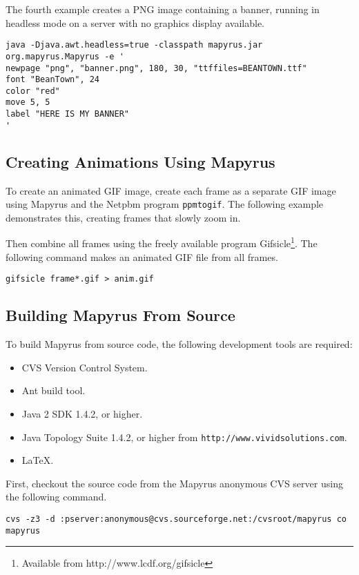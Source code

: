 The fourth example creates a PNG image containing a banner,
running in headless mode on a server with no graphics display available.

\begin{verbatim}
java -Djava.awt.headless=true -classpath mapyrus.jar org.mapyrus.Mapyrus -e '
newpage "png", "banner.png", 180, 30, "ttffiles=BEANTOWN.ttf"
font "BeanTown", 24
color "red"
move 5, 5
label "HERE IS MY BANNER"
'
\end{verbatim}

\subsection{Creating Animations Using Mapyrus}

To create an animated GIF image, create each frame as a separate
GIF image using Mapyrus and the Netpbm program \texttt{ppmtogif}.
The following example demonstrates this, creating frames that slowly
zoom in.



Then combine all frames using the freely available program
Gifsicle\footnote{Available from http://www.lcdf.org/gifsicle}.
The following command makes an animated GIF file from all frames.

\begin{verbatim}
gifsicle frame*.gif > anim.gif
\end{verbatim}

\subsection{Building Mapyrus From Source}

To build Mapyrus from source code, the following development tools
are required:

\begin{itemize}
\item
CVS Version Control System.
\item
Ant build tool.
\item
Java 2 SDK 1.4.2, or higher.
\item
Java Topology Suite 1.4.2, or higher from \texttt{http://www.vividsolutions.com}.
\item
\LaTeX.
\end{itemize}

First, checkout the source code from the Mapyrus anonymous CVS server
using the following command.

\begin{verbatim}
cvs -z3 -d :pserver:anonymous@cvs.sourceforge.net:/cvsroot/mapyrus co mapyrus
\end{verbatim}

